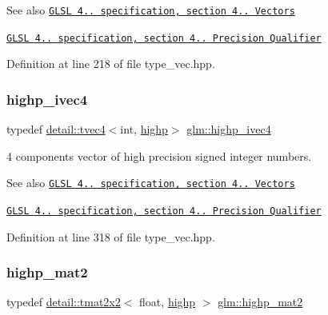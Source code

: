 \begin{DoxySeeAlso}{See also}
\href{http://www.opengl.org/registry/doc/GLSLangSpec.4.20.8.pdf}{\tt G\+L\+SL 4.. specification, section 4.. Vectors} 

\href{http://www.opengl.org/registry/doc/GLSLangSpec.4.20.8.pdf}{\tt G\+L\+SL 4.. specification, section 4.. Precision Qualifier} 
\end{DoxySeeAlso}


Definition at line 218 of file type\+\_\+vec.\+hpp.

\mbox{\label{group__core__precision_gaeba08fcf78aeae954c3335d73500ff8b}} 
\subsubsection{\texorpdfstring{highp\+\_\+ivec4}{highp\_ivec4}}
{\footnotesize\ttfamily typedef \hyperlink{structglm_1_1detail_1_1tvec4}{detail\+::tvec4}$<$int, \hyperlink{namespaceglm_a0f04f086094c747d227af4425893f545ac6f7eab42eacbb10d59a58e95e362074}{highp}$>$ \hyperlink{group__core__precision_gaeba08fcf78aeae954c3335d73500ff8b}{glm\+::highp\+\_\+ivec4}}

4 components vector of high precision signed integer numbers.

\begin{DoxySeeAlso}{See also}
\href{http://www.opengl.org/registry/doc/GLSLangSpec.4.20.8.pdf}{\tt G\+L\+SL 4.. specification, section 4.. Vectors} 

\href{http://www.opengl.org/registry/doc/GLSLangSpec.4.20.8.pdf}{\tt G\+L\+SL 4.. specification, section 4.. Precision Qualifier} 
\end{DoxySeeAlso}


Definition at line 318 of file type\+\_\+vec.\+hpp.

\mbox{\label{group__core__precision_gab9884251d84b95dbbf27aa1e4b3a1ec7}} 
\subsubsection{\texorpdfstring{highp\+\_\+mat2}{highp\_mat2}}
{\footnotesize\ttfamily typedef \hyperlink{structglm_1_1detail_1_1tmat2x2}{detail\+::tmat2x2}$<$ float, \hyperlink{namespaceglm_a0f04f086094c747d227af4425893f545ac6f7eab42eacbb10d59a58e95e362074}{highp} $>$ \hyperlink{group__core__precision_gab9884251d84b95dbbf27aa1e4b3a1ec7}{glm\+::highp\+\_\+mat2}}

